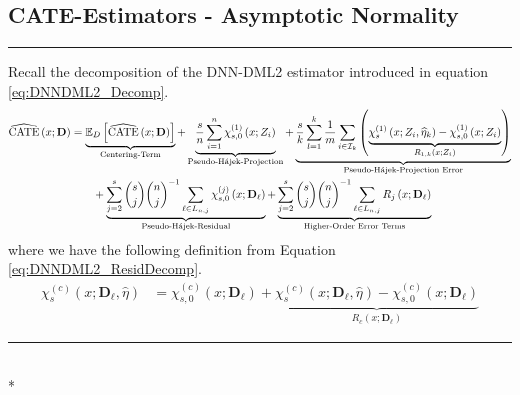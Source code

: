 \subsection{CATE-Estimators - Asymptotic Normality}
\hrule
Recall the decomposition of the DNN-DML2 estimator introduced in equation \ref{eq:DNNDML2_Decomp}.
\begin{equation}
    \begin{aligned}
        \widehat{\operatorname{CATE}}\left(x; \mathbf{D}\right)
        & = \underbrace{\mathbb{E}_{D}\left[\widehat{\operatorname{CATE}}\left(x; \mathbf{D}\right)\right]}_{\text{Centering-Term}}
        + \underbrace{\frac{s}{n}\sum_{i = 1}^{n} \chi_{s,0}^{(1)}\left(x; Z_{i}\right)}_{\text{Pseudo-H\'ajek-Projection}}
        + \underbrace{\frac{s}{k} \sum_{l = 1}^{k} \frac{1}{m} \sum_{i \in \mathcal{I}_{k}}\left(\underbrace{\chi_{s}^{(1)}\left(x; Z_{i}, \widehat{\eta}_{k}\right) - \chi_{s,0}^{(1)}\left(x; Z_{i}\right)}_{R_{1,k}\left(x; Z_{i}\right)}\right)}_{\text{Pseudo-H\'ajek-Projection Error}}\\
        & \quad \quad + \underbrace{\sum_{j = 2}^{s} \binom{s}{j} \binom{n}{j}^{-1}\sum_{\ell \in L_{n,j}} \chi_{s,0}^{(j)}\left(x; \mathbf{D}_{\ell}\right)}_{\text{Pseudo-H\'ajek-Residual}}
         + \underbrace{\sum_{j = 2}^{s} \binom{s}{j} \binom{n}{j}^{-1}\sum_{\ell \in L_{n,j}} R_{j}\left(x; \mathbf{D}_{\ell}\right)}_{\text{Higher-Order Error Terms}}
    \end{aligned}
\end{equation}
where we have the following definition from Equation \ref{eq:DNNDML2_ResidDecomp}.
\begin{equation}
    \begin{aligned}
        \chi_{s}^{(c)}\left(x; \mathbf{D}_{\ell}, \hat{\eta}\right)
        & = \chi_{s,0}^{(c)}\left(x; \mathbf{D}_{\ell}\right) + \underbrace{\chi_{s}^{(c)}\left(x; \mathbf{D}_{\ell}, \hat{\eta}\right) - \chi_{s,0}^{(c)}\left(x; \mathbf{D}_{\ell}\right)}_{R_{c}\left(x; \mathbf{D}_{\ell}\right)}
    \end{aligned}
\end{equation}

\hrule

\begin{lem}\label{lem:ps_hajek_error}\mbox{}\\*
    
\end{lem}

